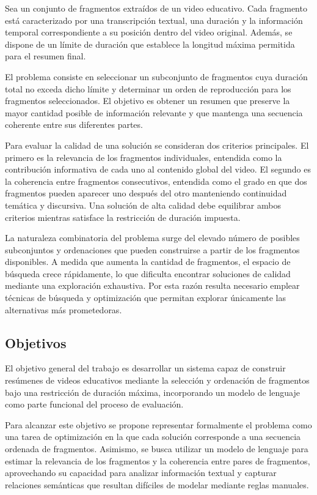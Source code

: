 \documentclass[12pt,a4paper]{article}
\begin{document}
Sea un conjunto de fragmentos extraídos de un video educativo. Cada fragmento está caracterizado por una transcripción textual, una duración y la información temporal correspondiente a su posición dentro del video original. Además, se dispone de un límite de duración que establece la longitud máxima permitida para el resumen final.

El problema consiste en seleccionar un subconjunto de fragmentos cuya duración total no exceda dicho límite y determinar un orden de reproducción para los fragmentos seleccionados. El objetivo es obtener un resumen que preserve la mayor cantidad posible de información relevante y que mantenga una secuencia coherente entre sus diferentes partes.

Para evaluar la calidad de una solución se consideran dos criterios principales. El primero es la relevancia de los fragmentos individuales, entendida como la contribución informativa de cada uno al contenido global del video. El segundo es la coherencia entre fragmentos consecutivos, entendida como el grado en que dos fragmentos pueden aparecer uno después del otro manteniendo continuidad temática y discursiva. Una solución de alta calidad debe equilibrar ambos criterios mientras satisface la restricción de duración impuesta.

La naturaleza combinatoria del problema surge del elevado número de posibles subconjuntos y ordenaciones que pueden construirse a partir de los fragmentos disponibles. A medida que aumenta la cantidad de fragmentos, el espacio de búsqueda crece rápidamente, lo que dificulta encontrar soluciones de calidad mediante una exploración exhaustiva. Por esta razón resulta necesario emplear técnicas de búsqueda y optimización que permitan explorar únicamente las alternativas más prometedoras.

\subsection{Objetivos}

El objetivo general del trabajo es desarrollar un sistema capaz de construir resúmenes de videos educativos mediante la selección y ordenación de fragmentos bajo una restricción de duración máxima, incorporando un modelo de lenguaje como parte funcional del proceso de evaluación.

Para alcanzar este objetivo se propone representar formalmente el problema como una tarea de optimización en la que cada solución corresponde a una secuencia ordenada de fragmentos. Asimismo, se busca utilizar un modelo de lenguaje para estimar la relevancia de los fragmentos y la coherencia entre pares de fragmentos, aprovechando su capacidad para analizar información textual y capturar relaciones semánticas que resultan difíciles de modelar mediante reglas manuales.
\end{document}
